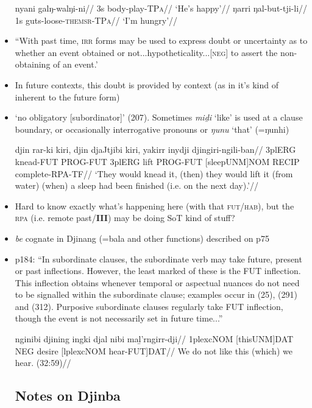 \documentclass[10pt]{article}
\begin{document}
\begin{itemize}
			\pex\a\begingl\gla nyani galŋ-walŋi-ni//
			\glb 3s body-play-\textsc{TPa}//
			\glft`He's happy'//\endgl
			\a\begingl\gla ŋarri ŋal-but-tji-li//
			\glb 1s guts-loose-\textsc{themsr-TPa}//
			\glft`I'm hungry'//\endgl\xe
			
			
			
			\item ``With past time, \textsc{irr} forms may be used to express doubt or uncertainty as to whether an event obtained or not...hypotheticality...[\textsc{neg}] to assert the non-obtaining of an event.'
			\item In future contexts, this doubt is provided by context (as in it's kind of inherent to the future form)
			
			
			\item `no obligatory [subordinator]' (207). Sometimes \textit{miḏi} `like' is used at a clause boundary, or occasionally interrogative pronouns or \textit{ŋunu} `that' (=ŋunhi)
			
			\pex\begingl\gla djin rar-ki kiri, djin djaJtjibi kiri, yakirr inydji djingiri-ngili-ban//
\glb 3plERG knead-FUT PROG-FUT 3plERG lift PROG-FUT [sleepUNM]NOM RECIP complete-RPA-TF//
\glft`They would knead it, (then) they would lift it (from water) (when) a sleep had been finished (i.e. on the next day).'//\endgl\xe
			
			\item Hard to know exactly what's happening here (with that \textsc{fut/hab}), but the \textsc{rpa} (i.e. remote past/\textbf{III}) may be doing SoT kind of stuff?
			
			\item \textit{be} cognate in Djinang (=bala and other functions) described on p75
			\item p184: ``In subordinate clauses, the subordinate verb may take future, present or past inflections. However, the least marked of these is the FUT inflection. This inflection obtains whenever temporal or aspectual nuances do not need to be signalled within the subordinate clause; examples occur in (25), (291) and (312). Purposive subordinate clauses regularly take FUT inflection, though the event is not necessarily set in future time...''
			
			\pex\begingl\gla nginibi djining ingki djal nibi maḻ'rngirr-dji//
\glb 1plexcNOM [thisUNM]DAT NEG desire [lplexcNOM hear-FUT]DAT//
\glft We do not like this (which) we hear. (32:59)//\endgl\xe
			
		\subsection{Notes on Djinba}	
			
	
	\end{itemize}
\end{document}
